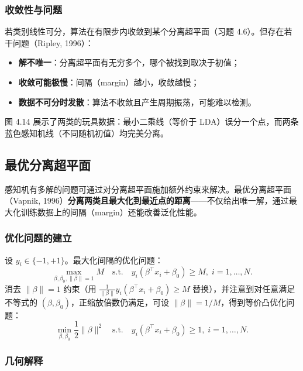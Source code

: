 \subsubsection{收敛性与问题}

若类别线性可分，算法在有限步内收敛到某个分离超平面（习题 4.6）。但存在若干问题（Ripley, 1996）：
\begin{itemize}
    \item \textbf{解不唯一}：分离超平面有无穷多个，哪个被找到取决于初值；
    \item \textbf{收敛可能极慢}：间隔（margin）越小，收敛越慢；
    \item \textbf{数据不可分时发散}：算法不收敛且产生周期振荡，可能难以检测。
\end{itemize}

图 4.14 展示了两类的玩具数据：最小二乘线（等价于 LDA）误分一个点，而两条蓝色感知机线（不同随机初值）均完美分离。


\subsection{最优分离超平面}

感知机有多解的问题可通过对分离超平面施加额外约束来解决。最优分离超平面（Vapnik, 1996）\textbf{分离两类且最大化到最近点的距离}——不仅给出唯一解，通过最大化训练数据上的间隔（margin）还能改善泛化性能。

\subsubsection{优化问题的建立}

设 $y_i \in \{-1, +1\}$。最大化间隔的优化问题：
\[
\max_{\beta, \beta_0, \|\beta\|=1} M \quad \text{s.t.} \quad y_i(\beta^\top x_i + \beta_0) \geq M, \; i = 1,\ldots,N.
\]
消去 $\|\beta\|=1$ 约束（用 $\frac{1}{\|\beta\|} y_i(\beta^\top x_i + \beta_0) \geq M$ 替换），并注意到对任意满足不等式的 $(\beta, \beta_0)$，正缩放倍数仍满足，可设 $\|\beta\| = 1/M$，得到等价凸优化问题：
\begin{equation}\label{eq:optimal_hyperplane}
    \min_{\beta, \beta_0} \frac12 \|\beta\|^2
    \quad \text{s.t.} \quad y_i(\beta^\top x_i + \beta_0) \geq 1, \; i = 1,\ldots,N.
\end{equation}

\subsubsection{几何解释}

